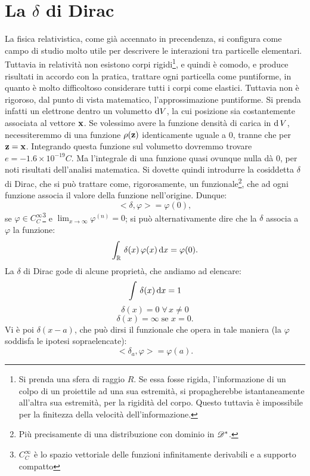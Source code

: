 \section{ La $\delta$ di Dirac}
La fisica relativistica, come gi\`a accennato in precendenza, si
configura come campo di studio molto utile per descrivere le
interazioni tra particelle elementari. Tuttavia in relativit\`a non
esistono corpi rigidi\footnote{Si prenda una sfera di raggio $R$. Se
  essa fosse rigida, l'informazione di un colpo di un proiettile ad
  una sua estremit\`a, si propagherebbe istantaneamente all'altra sua
  estremit\`a, per la rigidit\`a del corpo. Questo tuttavia \`e
  impossibile per la finitezza della velocit\`a dell'informazione.}, e
quindi \`e comodo, e produce risultati in accordo con la pratica,
trattare ogni particella come puntiforme, in quanto \`e molto
difficoltoso considerare tutti i corpi come elastici. Tuttavia non \`e
rigoroso, dal punto di vista matematico, l'approssimazione
puntiforme. Si prenda infatti un elettrone dentro un volumetto $\mathrm{d}
V$, la cui posizione sia costantemente associata al vettore
$\mathbf{x}$. Se volessimo avere la funzione densit\`a di carica in
$\mathrm{d}\,V$, necessiteremmo di una funzione $\rho(\mathbf{z})$ identicamente
uguale a 0, tranne che per $\mathbf{z}=\mathbf{x}$. Integrando questa
funzione sul volumetto dovremmo trovare $e = - 1.6 \times 10^{-19}
C$. Ma l'integrale di una funzione quasi ovunque nulla d\`a 0, per
noti risultati dell'analisi matematica. Si dovette quindi introdurre
la cosiddetta $\delta$ di Dirac, che si pu\`o trattare come,
rigorosamente, un funzionale\footnote{Pi\`u precisamente di una
  distribuzione con dominio in $\mathscr{D^{*}}$.}, che ad ogni funzione
associa il valore della funzione nell'origine.  Dunque:
\begin{equation}
  <\delta,\varphi> = \varphi(0),
  \label{eq:fun_delta}
\end{equation}
se $\varphi \in C^{\infty}_C$\footnote{$C^{\infty}_C$ \`e lo spazio
  vettoriale delle funzioni infinitamente derivabili e a supporto
  compatto} e $\lim_{x\rightarrow\infty} \varphi^{(n)} = 0$; si pu\`o
alternativamente dire che la $\delta$ associa a $\varphi$ la funzione:
\begin{equation}
  \int_{\mathbb{R}} \, \delta (x) \, \varphi(x) \, \mathrm{d}  x =
  \varphi(0).
  \label{eq:int_delta}
\end{equation}
La $\delta$ di Dirac gode di alcune propriet\`a, che andiamo ad
elencare:
\begin{equation}
  \int \, \delta(x)\, \mathrm{d}  x = 1
\end{equation}
\begin{equation}
  \delta(x) = 0 \; \forall\,x \neq 0
  \label{eq:eg_delta}
\end{equation}
\begin{equation}
  \delta(x) = \infty \; \mbox{se } x=0.
  \label{eq:imp_delta}
\end{equation}
Vi \`e poi $\delta (x - a)$, che pu\`o dirsi il funzionale che opera
in tale maniera (la $\varphi$ soddisfa le ipotesi sopraelencate):
$$
<\delta_a,\varphi> = \varphi(a).
$$

